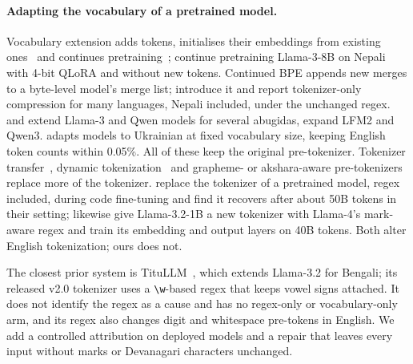 \paragraph{Adapting the vocabulary of a pretrained model.} Vocabulary extension adds tokens, initialises their embeddings from existing ones~\citep{gee-etal-2022-fast,minixhofer-etal-2022-wechsel,dobler-de-melo-2023-focus,liu-etal-2024-ofa,remy2024transtokenization} and continues pretraining~\citep{cui2023chinesellama,tejaswi-etal-2024-exploring,kim2024eeve,csaki2024sambalingo,nag2024efficientcpt}; \citet{duwal2024nepalidapt} continue pretraining Llama-3-8B on Nepali with 4-bit QLoRA and without new tokens. Continued BPE appends new merges to a byte-level model's merge list; \citet{purason-etal-2026-teaching} introduce it and report tokenizer-only compression for many languages, Nepali included, under the unchanged regex. \citet{yamaguchi2026lowres} and \citet{yamaguchi2025elchat} extend Llama-3 and Qwen models for several abugidas, \citet{smith2026inplace} expand LFM2 and \citet{mehta2026defragmenting} Qwen3. \citet{didenko2026writing} adapts models to Ukrainian at fixed vocabulary size, keeping English token counts within 0.05\%. All of these keep the original pre-tokenizer. Tokenizer transfer~\citep{minixhofer2024zett,minixhofer2025alm,dobler2024tokenizerswap}, dynamic tokenization~\citep{feher2024dynamic} and grapheme- or akshara-aware pre-tokenizers~\citep{kapila2026typedriven,darshana2026wwho} replace more of the tokenizer. \citet{dagan2024getting} replace the tokenizer of a pretrained model, regex included, during code fine-tuning and find it recovers after about 50B tokens in their setting; \citet{rana2025mutant} likewise give Llama-3.2-1B a new tokenizer with Llama-4's mark-aware regex and train its embedding and output layers on 40B tokens. Both alter English tokenization; ours does not.

The closest prior system is TituLLM~\citep{nahin-etal-2025-titullms}, which extends Llama-3.2 for Bengali; its released v2.0 tokenizer uses a \texttt{\textbackslash w}-based regex that keeps vowel signs attached. It does not identify the regex as a cause and has no regex-only or vocabulary-only arm, and its regex also changes digit and whitespace pre-tokens in English. We add a controlled attribution on deployed models and a repair that leaves every input without marks or Devanagari characters unchanged.
